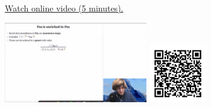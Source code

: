 
\begin{minipage}{10cm}
    \href{https://act4e-spring21.netlify.app/videos/spring2021-enrichment:pos-en-pos.html}{Watch online video (5 minutes).}
        
    \href{https://act4e-spring21.netlify.app/videos/spring2021-enrichment:pos-en-pos.html}{\includegraphics[height=3.5cm]{spring2021-enrichment:pos-en-pos/thumbnails.jpg}}
    \href{https://act4e-spring21.netlify.app/videos/spring2021-enrichment:pos-en-pos.html}{\includegraphics[height=2.5cm]{spring2021-enrichment:pos-en-pos/qrcode.png}}
\end{minipage}
